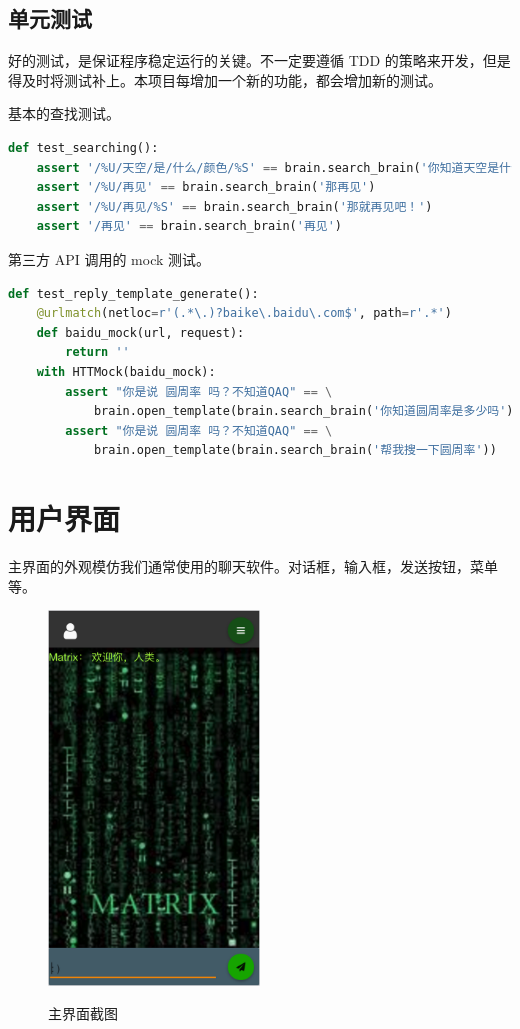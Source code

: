 \documentclass[bachelor,winfonts]{jnuthesis}
\begin{document}
\subsection{单元测试}

好的测试，是保证程序稳定运行的关键。不一定要遵循 TDD 的策略来开发，但是得及时将测试补上。本项目每增加一个新的功能，都会增加新的测试。

基本的查找测试。

\begin{lstlisting}[language=Python]
def test_searching():
    assert '/%U/天空/是/什么/颜色/%S' == brain.search_brain('你知道天空是什么颜色吗？')
    assert '/%U/再见' == brain.search_brain('那再见')
    assert '/%U/再见/%S' == brain.search_brain('那就再见吧！')
    assert '/再见' == brain.search_brain('再见')
\end{lstlisting}

第三方 API 调用的 mock 测试。

\begin{lstlisting}[language=Python]
def test_reply_template_generate():
    @urlmatch(netloc=r'(.*\.)?baike\.baidu\.com$', path=r'.*')
    def baidu_mock(url, request):
        return ''
    with HTTMock(baidu_mock):
        assert "你是说 圆周率 吗？不知道QAQ" == \
            brain.open_template(brain.search_brain('你知道圆周率是多少吗'))
        assert "你是说 圆周率 吗？不知道QAQ" == \
            brain.open_template(brain.search_brain('帮我搜一下圆周率'))
\end{lstlisting}

\section{用户界面}

主界面的外观模仿我们通常使用的聊天软件。对话框，输入框，发送按钮，菜单等。

\begin{figure}[H]
  \centering
  \includegraphics[width= 0.5\textwidth]{chat1.png}\\
  \caption{主界面截图}\label{fig:pic4}
\end{figure}
\end{document}
